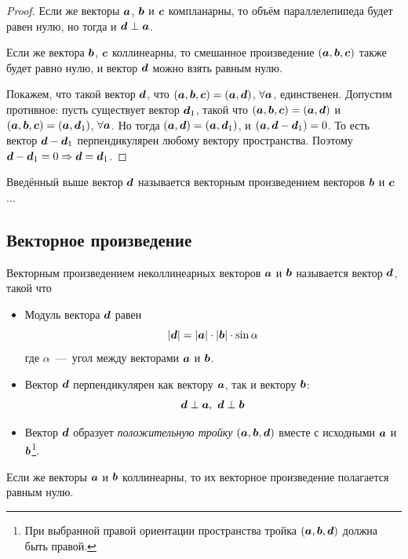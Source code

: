 \documentclass[a4paper,12pt]{article}
\begin{document}
\begin{proof}
    Если же векторы $\boldsymbol a$, $\boldsymbol b$ и $\boldsymbol c$ компланарны, то объём параллелепипеда будет равен нулю, но тогда и $\bds d \hm\perp \bds a$.
    
    Если же вектора $\boldsymbol b$, $\boldsymbol c$ коллинеарны, то смешанное произведение $(\boldsymbol a, \boldsymbol b, \boldsymbol c)$ также будет равно нулю, и вектор $\boldsymbol d$ можно взять равным нулю.
    
    Покажем, что такой вектор $\boldsymbol d$, что $(\bds a, \bds b, \bds c) \hm= (\bds a, \bds d)$, $\forall \boldsymbol a$, единственен.
    Допустим противное: пусть существует вектор $\boldsymbol d_1$, такой что $(\bds a, \bds b, \bds c) \hm= (\bds a, \bds d)$ и $(\bds a, \bds b, \bds c) \hm= (\bds a, \bds d_1)$, $\forall \boldsymbol a$.
    Но тогда $(\bds a, \bds d) \hm= (\bds a, \bds d_1)$, и $(\bds a, \bds d \hm- \bds d_1) \hm= 0$.
    То есть вектор $\bds d \hm- \bds d_1$ перпендикулярен любому вектору пространства.
    Поэтому $\bds d \hm- \bds d_1 \hm= 0 \hm\Rightarrow \bds d \hm= \bds d_1$.
  \end{proof}
  
  Введённый выше вектор $\boldsymbol d$ называется векторным произведением векторов $\boldsymbol b$ и $\boldsymbol c$...
  
  \subsection{Векторное произведение}
  
  \begin{definition}
    Векторным произведением неколлинеарных векторов $\boldsymbol a$ и $\boldsymbol b$ называется вектор $\boldsymbol d$, такой что
    \begin{itemize}
      \item Модуль вектора $\boldsymbol d$ равен
      \[
        |\boldsymbol d| = |\boldsymbol a| \cdot |\boldsymbol b| \cdot \sin\alpha
      \]
      где $\alpha$~---~угол между векторами $\boldsymbol a$ и $\boldsymbol b$.
      
      \item Вектор $\boldsymbol d$ перпендикулярен как вектору $\boldsymbol a$, так и вектору $\boldsymbol b$:
      \[
        \boldsymbol d \perp \boldsymbol a,\ \boldsymbol d \perp \boldsymbol b
      \]
      
      \item Вектор $\boldsymbol d$ образует \emph{положительную тройку} $(\boldsymbol a, \boldsymbol b, \boldsymbol d)$ вместе с исходными $\boldsymbol a$ и $\boldsymbol b$\footnote{При выбранной правой ориентации пространства тройка $(\boldsymbol a, \boldsymbol b, \boldsymbol d)$ должна быть правой.}.
    \end{itemize}
    
    Если же векторы $\boldsymbol a$ и $\boldsymbol b$ коллинеарны, то их векторное произведение полагается равным нулю.
  \end{definition}
  
\end{document}
